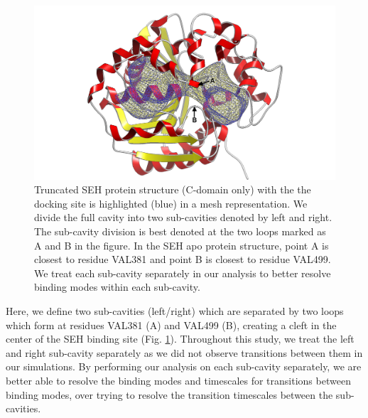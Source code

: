 \begin{figure}
    \centering
    \includegraphics{chapter6/Figures/protein-mark.png}
    \caption[Truncated SEH Protein Structure]{Truncated SEH protein structure (C-domain only) with the the docking site is highlighted (blue) in a mesh representation. We divide the full cavity into two sub-cavities denoted by left and right. The sub-cavity division is best denoted at the two loops marked as A and B in the figure. In the SEH apo protein structure, point A is closest to residue VAL381 and point B is closest to residue VAL499. We treat each sub-cavity separately in our analysis to better resolve binding modes within each sub-cavity.}
    \label{fig:truncated-protein}
\end{figure}

Here, we define two sub-cavities (left/right) which are separated by two loops which form at residues VAL381 (A) and VAL499 (B), creating a cleft in the center of the SEH binding site (Fig. \ref{fig:truncated-protein}).
Throughout this study, we treat the left and right sub-cavity separately as we did not observe transitions between them in our simulations.
By performing our analysis on each sub-cavity separately, we are better able to resolve the binding modes and timescales for transitions between binding modes, over trying to resolve the transition timescales between the sub-cavities.

